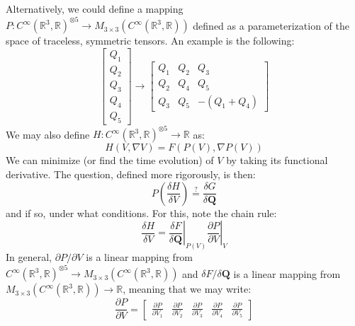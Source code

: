 \documentclass[reqno]{article}
\newcommand{\Q}{\mathbf{Q}}
\begin{document}
Alternatively, we could define a mapping $P: C^{\infty}(\mathbb{R}^3, \mathbb{R})^{\otimes 5} \to M_{3\times 3} \left( C^{\infty} \left( \mathbb{R}^3, \mathbb{R} \right) \right)$ defined as a parameterization of the space of traceless, symmetric tensors.
An example is the following:
\begin{equation}
    \begin{bmatrix}
        Q_1 \\
        Q_2 \\
        Q_3 \\
        Q_4 \\
        Q_5
    \end{bmatrix}
    \to
    \begin{bmatrix}
        Q_1 &Q_2 &Q_3 \\
        Q_2 &Q_4 &Q_5 \\
        Q_3 &Q_5 &-(Q_1 + Q_4)
    \end{bmatrix}
\end{equation}
We may also define $H: C^{\infty}(\mathbb{R}^3, \mathbb{R})^{\otimes 5} \to \mathbb{R}$ as:
\begin{equation}
    H \left( V, \nabla V \right)
    =
    F \left( P(V), \nabla P(V) \right)
\end{equation}
We can minimize (or find the time evolution) of $V$ by taking its functional derivative.
The question, defined more rigorously, is then:
\begin{equation}
    P \left( \frac{\delta H}{\delta V} \right)
    \overset{?}{=}
    \frac{\delta G}{\delta \Q}
\end{equation}
and if so, under what conditions.
For this, note the chain rule:
\begin{equation}
    \frac{\delta H}{\delta V}
    =
    \left. \frac{\delta F}{\delta \Q} \right|_{P(V)}
    \left. \frac{\partial P}{\partial V} \right|_{V}
\end{equation}
In general, $\partial P / \partial V$ is a linear mapping from $C^{\infty}(\mathbb{R}^3, \mathbb{R})^{\otimes 5} \to M_{3\times 3} \left( C^{\infty} \left( \mathbb{R}^3, \mathbb{R} \right) \right)$ and $\delta F / \delta \Q$ is a linear mapping from $M_{3\times 3} \left( C^{\infty} \left( \mathbb{R}^3, \mathbb{R} \right) \right) \to \mathbb{R}$, meaning that we may write:
\begin{equation}
    \frac{\partial P}{\partial V}
    =
    \begin{bmatrix}
        \frac{\partial P}{\partial V_1}  
        &\frac{\partial P}{\partial V_2}
        &\frac{\partial P}{\partial V_3}
        &\frac{\partial P}{\partial V_4}
        &\frac{\partial P}{\partial V_5}
    \end{bmatrix}
\end{equation}
\end{document}
